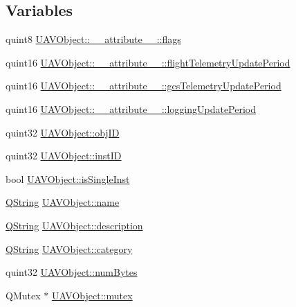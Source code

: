 \subsection*{\-Variables}
\begin{DoxyCompactItemize}
\item 
quint8 \hyperlink{group___u_a_v_objects_plugin_gaf5421bbd1e8748b9f0f12ba5b6722bdd}{\-U\-A\-V\-Object\-::\-\_\-\-\_\-attribute\-\_\-\-\_\-\-::flags}
\item 
quint16 \hyperlink{group___u_a_v_objects_plugin_gaa29a38fd35ce73e9e4afd2698de44797}{\-U\-A\-V\-Object\-::\-\_\-\-\_\-attribute\-\_\-\-\_\-\-::flight\-Telemetry\-Update\-Period}
\item 
quint16 \hyperlink{group___u_a_v_objects_plugin_ga3698244bb0c29537b3d26442624ee03b}{\-U\-A\-V\-Object\-::\-\_\-\-\_\-attribute\-\_\-\-\_\-\-::gcs\-Telemetry\-Update\-Period}
\item 
quint16 \hyperlink{group___u_a_v_objects_plugin_gad4c54f8af5beeb9dc2bbe402c9f01299}{\-U\-A\-V\-Object\-::\-\_\-\-\_\-attribute\-\_\-\-\_\-\-::logging\-Update\-Period}
\item 
quint32 \hyperlink{group___u_a_v_objects_plugin_gafc50acdaa311c9fd9aaddf90fd578c14}{\-U\-A\-V\-Object\-::obj\-I\-D}
\item 
quint32 \hyperlink{group___u_a_v_objects_plugin_gad8d656542a04e9fbef607ff178f6d9d3}{\-U\-A\-V\-Object\-::inst\-I\-D}
\item 
bool \hyperlink{group___u_a_v_objects_plugin_gaa279cad3a000cc930e7f386672426bcb}{\-U\-A\-V\-Object\-::is\-Single\-Inst}
\item 
\hyperlink{group___u_a_v_objects_plugin_gab9d252f49c333c94a72f97ce3105a32d}{\-Q\-String} \hyperlink{group___u_a_v_objects_plugin_gadf898ed0961464f4a3f8e05fb28019f5}{\-U\-A\-V\-Object\-::name}
\item 
\hyperlink{group___u_a_v_objects_plugin_gab9d252f49c333c94a72f97ce3105a32d}{\-Q\-String} \hyperlink{group___u_a_v_objects_plugin_gaeeb0e865791ad6b21d83ef571d1ce48b}{\-U\-A\-V\-Object\-::description}
\item 
\hyperlink{group___u_a_v_objects_plugin_gab9d252f49c333c94a72f97ce3105a32d}{\-Q\-String} \hyperlink{group___u_a_v_objects_plugin_gae96da3f59e51fb5c3ca43056bda4a63e}{\-U\-A\-V\-Object\-::category}
\item 
quint32 \hyperlink{group___u_a_v_objects_plugin_ga260cfb19e663f64d51ba1258e760a207}{\-U\-A\-V\-Object\-::num\-Bytes}
\item 
\-Q\-Mutex $\ast$ \hyperlink{group___u_a_v_objects_plugin_gacf8a1ff5bac6d34fc1d7192a86194361}{\-U\-A\-V\-Object\-::mutex}

\end{DoxyCompactItemize}
